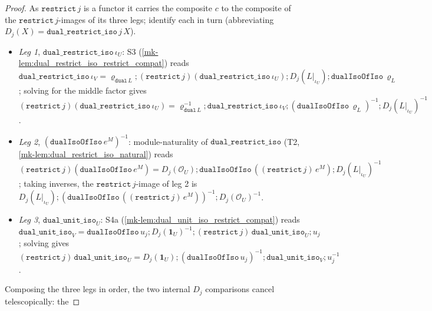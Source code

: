 \begin{proof}
  \leanok
  As \(\mathtt{restrict}\,j\) is a functor it carries the composite \(c\) to the composite of the
  \(\mathtt{restrict}\,j\)-images of its three legs; identify each in turn (abbreviating
  \(D_j(X) = \mathtt{dual\_restrict\_iso}\,j\,X\)).
  \begin{itemize}
    \item \emph{Leg 1}, \(\mathtt{dual\_restrict\_iso}\,\iota_U\): S3
      (\ref{mk-lem:dual_restrict_iso_restrict_compat}) reads
      \(\mathtt{dual\_restrict\_iso}\,\iota_V = \varrho_{\mathtt{dual}\,L}
        \mathbin{;} (\mathtt{restrict}\,j)(\mathtt{dual\_restrict\_iso}\,\iota_U)
        \mathbin{;} D_j(L|_{\iota_U}) \mathbin{;} \mathtt{dualIsoOfIso}\,\varrho_L\);
      solving for the middle factor gives
      \((\mathtt{restrict}\,j)(\mathtt{dual\_restrict\_iso}\,\iota_U)
        = \varrho_{\mathtt{dual}\,L}^{-1} \mathbin{;} \mathtt{dual\_restrict\_iso}\,\iota_V
          \mathbin{;} (\mathtt{dualIsoOfIso}\,\varrho_L)^{-1} \mathbin{;} D_j(L|_{\iota_U})^{-1}\).
    \item \emph{Leg 2}, \((\mathtt{dualIsoOfIso}\,e^M)^{-1}\): module-naturality of
      \(\mathtt{dual\_restrict\_iso}\) (T2, \ref{mk-lem:dual_restrict_iso_natural}) reads
      \((\mathtt{restrict}\,j)(\mathtt{dualIsoOfIso}\,e^M)
        = D_j(\mathcal O_U) \mathbin{;} \mathtt{dualIsoOfIso}\,((\mathtt{restrict}\,j)\,e^M)
          \mathbin{;} D_j(L|_{\iota_U})^{-1}\);
      taking inverses, the \(\mathtt{restrict}\,j\)-image of leg 2 is
      \(D_j(L|_{\iota_U}) \mathbin{;} (\mathtt{dualIsoOfIso}\,((\mathtt{restrict}\,j)\,e^M))^{-1}
        \mathbin{;} D_j(\mathcal O_U)^{-1}\).
    \item \emph{Leg 3}, \(\mathtt{dual\_unit\_iso}_U\): S4a
      (\ref{mk-lem:dual_unit_iso_restrict_compat}) reads
      \(\mathtt{dual\_unit\_iso}_V = \mathtt{dualIsoOfIso}\,u_j \mathbin{;} D_j(\mathbf 1_U)^{-1}
        \mathbin{;} (\mathtt{restrict}\,j)\,\mathtt{dual\_unit\_iso}_U \mathbin{;} u_j\);
      solving gives \((\mathtt{restrict}\,j)\,\mathtt{dual\_unit\_iso}_U
        = D_j(\mathbf 1_U) \mathbin{;} (\mathtt{dualIsoOfIso}\,u_j)^{-1}
          \mathbin{;} \mathtt{dual\_unit\_iso}_V \mathbin{;} u_j^{-1}\).
  \end{itemize}
  Composing the three legs in order, the two internal \(D_j\) comparisons cancel telescopically: the

\end{proof}
